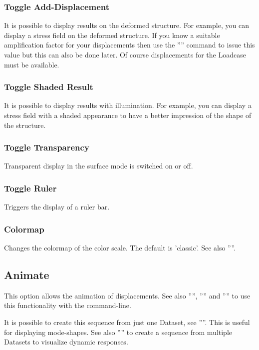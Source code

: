 \documentclass{article}
\begin{document}
\subsubsection{\label{Toggle Add-Displacement}Toggle Add-Displacement}
It is possible to display results on the deformed structure. For example, you can display a stress field on the deformed structure. If you know a suitable amplification factor for your displacements then use the '''' command to issue this value but this can also be done later. Of course displacements for the Loadcase must be available.

\subsubsection{\label{Toggle Shaded Result}Toggle Shaded Result}
It is possible to display results with illumination. For example, you can display a stress field with a shaded appearance to have a better impression of the shape of the structure.

\subsubsection{\label{Toggle Transparency}Toggle Transparency}
Transparent display in the surface mode is switched on or off.

\subsubsection{\label{Toggle Ruler}Toggle Ruler}
Triggers the display of a ruler bar.

\subsubsection{\label{Colormap}Colormap}
Changes the colormap of the color scale. The default is 'classic'. See also ''''.

\subsection{\label{animation}Animate}
This option allows the animation of displacements. See also '''', '''' and '''' to use this functionality with the command-line.

It is possible to create this sequence from just one Dataset, see ''''. This is useful for displaying mode-shapes. See also '''' to create a sequence from multiple Datasets to visualize dynamic responses.
   
\end{document}
